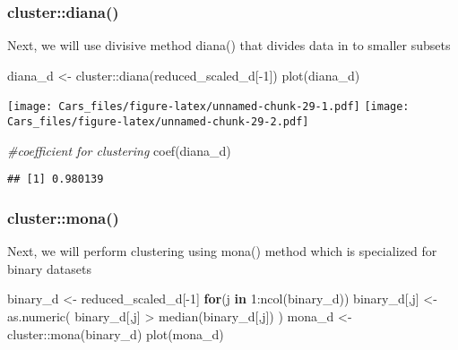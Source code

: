 \documentclass[
]{article}
\newenvironment{Shaded}{\begin{snugshade}}{\end{snugshade}}
\newcommand{\CommentTok}[1]{\textcolor[rgb]{0.56,0.35,0.01}{\textit{#1}}}
\newcommand{\ControlFlowTok}[1]{\textcolor[rgb]{0.13,0.29,0.53}{\textbf{#1}}}
\newcommand{\DecValTok}[1]{\textcolor[rgb]{0.00,0.00,0.81}{#1}}
\newcommand{\FunctionTok}[1]{\textcolor[rgb]{0.00,0.00,0.00}{#1}}
\newcommand{\NormalTok}[1]{#1}
\newcommand{\OtherTok}[1]{\textcolor[rgb]{0.56,0.35,0.01}{#1}}
\newcommand{\SpecialCharTok}[1]{\textcolor[rgb]{0.00,0.00,0.00}{#1}}
\begin{document}
\hypertarget{clusterdiana}{%
\subsubsection{cluster::diana()}\label{clusterdiana}}

Next, we will use divisive method diana() that divides data in to
smaller subsets

\begin{Shaded}
\begin{Highlighting}[]
\NormalTok{diana\_d }\OtherTok{\textless{}{-}}\NormalTok{ cluster}\SpecialCharTok{::}\FunctionTok{diana}\NormalTok{(reduced\_scaled\_d[}\SpecialCharTok{{-}}\DecValTok{1}\NormalTok{])}
\FunctionTok{plot}\NormalTok{(diana\_d)}
\end{Highlighting}
\end{Shaded}

\texttt{[image: Cars\_files/figure-latex/unnamed-chunk-29-1.pdf]}
\texttt{[image: Cars\_files/figure-latex/unnamed-chunk-29-2.pdf]}

\begin{Shaded}
\begin{Highlighting}[]
\CommentTok{\#coefficient for clustering}
\FunctionTok{coef}\NormalTok{(diana\_d)}
\end{Highlighting}
\end{Shaded}

\begin{verbatim}
## [1] 0.980139
\end{verbatim}

\hypertarget{clustermona}{%
\subsubsection{cluster::mona()}\label{clustermona}}

Next, we will perform clustering using mona() method which is
specialized for binary datasets

\begin{Shaded}
\begin{Highlighting}[]
\NormalTok{binary\_d }\OtherTok{\textless{}{-}}\NormalTok{ reduced\_scaled\_d[}\SpecialCharTok{{-}}\DecValTok{1}\NormalTok{]}
\ControlFlowTok{for}\NormalTok{(j }\ControlFlowTok{in} \DecValTok{1}\SpecialCharTok{:}\FunctionTok{ncol}\NormalTok{(binary\_d)) binary\_d[,j] }\OtherTok{\textless{}{-}} \FunctionTok{as.numeric}\NormalTok{(}
\NormalTok{  binary\_d[,j] }\SpecialCharTok{\textgreater{}} \FunctionTok{median}\NormalTok{(binary\_d[,j])}
\NormalTok{)}
\NormalTok{mona\_d }\OtherTok{\textless{}{-}}\NormalTok{ cluster}\SpecialCharTok{::}\FunctionTok{mona}\NormalTok{(binary\_d)}
\FunctionTok{plot}\NormalTok{(mona\_d)}
\end{Highlighting}
\end{Shaded}
\end{document}
